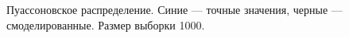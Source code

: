\documentclass[12pt, a4paper]{article}
\begin{document}
\begin{figure}[H]
\caption{Пуассоновское распределение. Синие --- точные значения, черные --- смоделированные. Размер выборки 1000.}
\end{figure}
\end{document}
